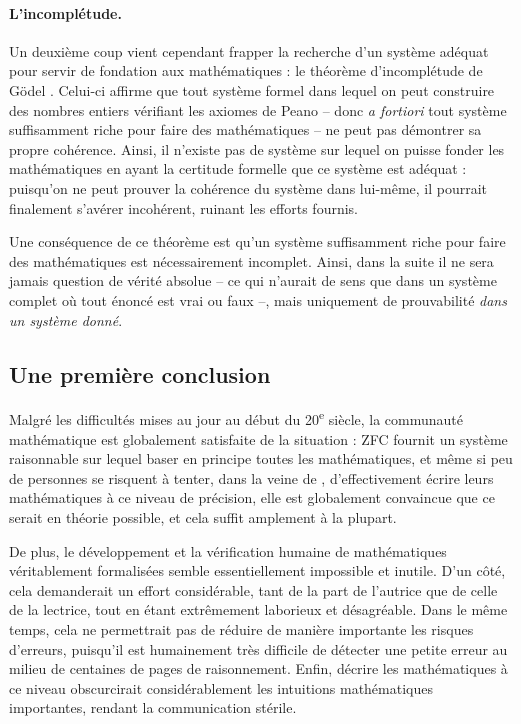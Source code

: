 \paragraph{L’incomplétude.}
Un deuxième coup vient cependant frapper la recherche d’un système adéquat pour
servir de fondation aux mathématiques : le théorème d’incomplétude de Gödel
\cite{incomplétude}. Celui-ci affirme que tout système formel dans lequel on peut
construire des nombres entiers vérifiant les axiomes de Peano – donc
\textit{a fortiori} tout système suffisamment riche pour faire des mathématiques –
ne peut pas démontrer sa propre cohérence. Ainsi, il n’existe pas de
système sur lequel on puisse fonder les mathématiques en ayant la certitude
formelle que ce système est adéquat : puisqu’on ne peut prouver la cohérence du
système dans lui-même, il pourrait finalement s’avérer incohérent, ruinant les
efforts fournis.

Une conséquence de ce théorème est qu’un système suffisamment riche
pour faire des mathématiques est nécessairement incomplet.
Ainsi, dans la suite il ne sera jamais question de vérité absolue –
ce qui n’aurait de sens que dans un système complet
où tout énoncé est vrai ou faux –, mais
uniquement de prouvabilité \emph{dans un système donné}.

\subsection{Une première conclusion}
Malgré les difficultés mises au jour au début du 20\textsuperscript{e}
siècle, la communauté mathématique est globalement
satisfaite de la situation : ZFC fournit un système raisonnable sur
lequel baser en principe toutes les mathématiques, et même si peu de
personnes se risquent à tenter, dans la veine de \cite{Principia},
d’effectivement écrire leurs mathématiques à ce niveau de précision,
elle est globalement convaincue que ce serait en théorie
possible, et cela suffit amplement à la plupart.

De plus, le développement et la vérification humaine de mathématiques véritablement
formalisées semble essentiellement impossible et inutile.
D’un côté, cela demanderait un effort considérable,
tant de la part de l’autrice que de celle de la lectrice, tout en étant
extrêmement laborieux et désagréable.
Dans le même temps, cela ne permettrait pas de réduire de manière importante
les risques d’erreurs, puisqu’il est
humainement très difficile de détecter une petite erreur au milieu de centaines de pages de raisonnement.
Enfin, décrire les mathématiques à ce niveau obscurcirait
considérablement les intuitions mathématiques importantes,
rendant la communication stérile.


